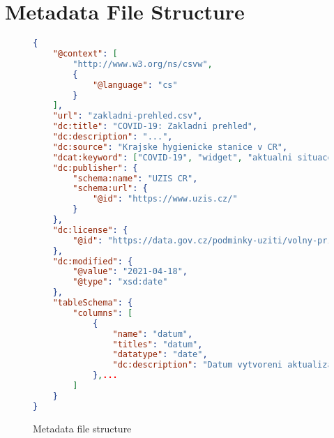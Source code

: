 \chapter{Metadata File Structure}\label{ch:metadata-file-structure}

\begin{figure}[htb]
    \centering
    \begin{lstlisting}[language=json,firstnumber=1]
{
    "@context": [
        "http://www.w3.org/ns/csvw",
        {
            "@language": "cs"
        }
    ],
    "url": "zakladni-prehled.csv",
    "dc:title": "COVID-19: Zakladni prehled",
    "dc:description": "...",
    "dc:source": "Krajske hygienicke stanice v CR",
    "dcat:keyword": ["COVID-19", "widget", "aktualni situace"],
    "dc:publisher": {
        "schema:name": "UZIS CR",
        "schema:url": {
            "@id": "https://www.uzis.cz/"
        }
    },
    "dc:license": {
        "@id": "https://data.gov.cz/podminky-uziti/volny-pristup/"
    },
    "dc:modified": {
        "@value": "2021-04-18",
        "@type": "xsd:date"
    },
    "tableSchema": {
        "columns": [
            {
                "name": "datum",
                "titles": "datum",
                "datatype": "date",
                "dc:description": "Datum vytvoreni aktualizace."
            },...
        ]
    }
}
    \end{lstlisting}

    \caption{Metadata file structure}
    \label{ls:metadata}
\end{figure}
\FloatBarrier
